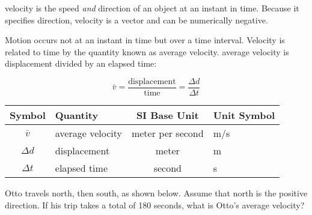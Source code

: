 \documentclass[main.tex]{subfiles}
\begin{document}
\Gls{velocity} is the speed \textit{and} direction of an object at an instant in time. Because it specifies direction, velocity is a vector and can be numerically negative.

\vspace{1em}

Motion occurs not at an instant in time but over a time interval. Velocity is related to time by the quantity known as average velocity. \Gls{average velocity} is displacement divided by an elapsed time:
 
\begin{equation} \label{Elg0tf}
    \bar{v} = 
   \mathrm{\frac{displacement}{time}} = \frac{\Delta{d}}{\Delta{t}}
\end{equation}


\begin{center}
    \begin{tabular}{cl|cl}
    \hline
    \textbf{Symbol} & \textbf{Quantity} & \textbf{SI Base Unit} & \textbf{Unit Symbol}  \\
    \hline\hline
        $\bar{v}$ & average velocity & meter per second & m/s\\
        $\Delta{d}$ & displacement & meter & m\\
        $\Delta t$ & elapsed time & second & s \\
    \hline
    \end{tabular}
\end{center}

\begin{example}
Otto travels north, then south, as shown below. Assume that north is the positive direction. If his trip takes a total of 180 seconds, what is Otto's average velocity?
\end{example}

\begin{center}
    \captionsetup{type=figure,margin=1in,font=scriptsize}
    \label{vds9fx}
\end{center}
\end{document}
